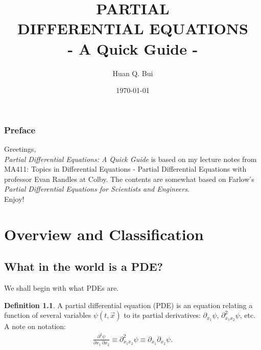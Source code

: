 \documentclass{book}
\theoremstyle{definition}
\newtheorem{defn}{Definition}[section]
\begin{document}
\begin{titlepage}\centering
 \clearpage
 \title{\textsc{\bf{PARTIAL\\ DIFFERENTIAL EQUATIONS}}\\\smallskip - A Quick Guide -\\}
 \author{\bigskip Huan Q. Bui}
 \date{\today}
 \maketitle
 \thispagestyle{empty}
\end{titlepage}

\subsection*{Preface}

Greetings,\\

\textit{Partial Differential Equations: A Quick Guide} is based on my lecture notes from MA411: Topics in Differential Equations - Partial Differential Equations with professor Evan Randles at Colby. The contents are somewhat based on Farlow's \textit{Partial Differential Equations for Scientists and Engineers}.\\	

Enjoy!

\newpage
\tableofcontents
\newpage

\chapter{Overview and Classification}



\section{What in the world is a PDE?}
We shall begin with what PDEs are. 
\begin{defn}
	A partial differential equation (PDE) is an equation relating a function of several variables $\psi(t,\vec{x})$ to its partial derivatives: $\partial_{x_1}\psi$, $\partial^2_{x_1x_2}\psi$, etc.\\
	
	A note on notation:
	\begin{align*}
	\frac{\partial^2 \psi}{\partial x_1\,\partial x_2} \equiv \partial^2_{x_1x_2}\psi \equiv \partial_{x_1}\partial_{x_2}\psi.
	\end{align*}
\end{defn}
\end{document}
